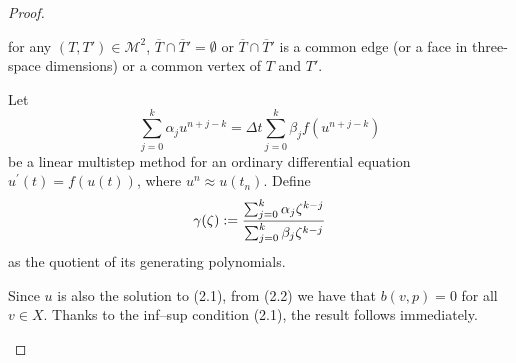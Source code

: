 \documentclass{imamci}
\numberwithin{equation}{section}
\begin{document}
\begin{proof}
\begin{BL}
\item for any $(T,T') \in \mathcal{M}^2$, $\overline T \cap \overline T' = \emptyset$ or $\overline T \cap \overline T'$ is a common edge (or a face in three-space dimensions) or a common vertex of $T$ and $T'$.
\end{BL}
\begin{definition}
Let 
\begin{equation}
\sum_{j=0}^{k}\alpha_{j}u^{n+j-k}={\Delta t}\sum_{j=0}^{k}%
\beta_{j}f(u^{n+j-k})  \label{eqn:4}
\end{equation}
be a linear multistep method for an ordinary differential equation %
\mbox{$u^{\prime}(t)=f(u(t))$}, where $u^{n}\approx u(t_{n})$. Define 
\begin{equation*}
\gamma(\zeta):=\frac{\sum_{j=0}^{k}\alpha_{j}\zeta^{k-j}}{%
\sum_{j=0}^{k}\beta_{j}\zeta^{k-j}}
\end{equation*}
as the quotient of its generating polynomials. %
\end{definition}
\begin{algorithm}
Since $u$ is also the solution to (2.1), from (2.2)
we have that $b(v,p)=0$ for all $v\in X$. Thanks to the inf--sup condition (2.1),
the result follows immediately.
\end{algorithm}




\end{proof}
\end{document}
